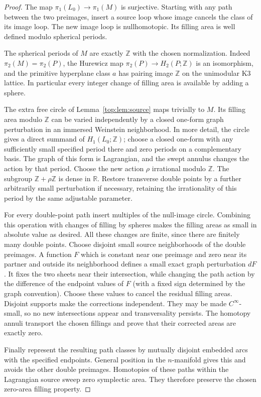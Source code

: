 \documentclass[11pt]{article}
\numberwithin{equation}{section}
\theoremstyle{definition}
\theoremstyle{remark}
\newcommand{\R}{\mathbb R}
\newcommand{\Z}{\mathbb Z}
\begin{document}
\begin{proof}
The map $\pi_1(L_0)\to\pi_1(M)$ is surjective.  Starting with any
path between the two preimages, insert a source loop whose image
cancels the class of its image loop.  The new image loop is
nullhomotopic.  Its filling area is well defined modulo spherical
periods.

The spherical periods of $M$ are exactly $\Z$ with the chosen
normalization.  Indeed $\pi_2(M)=\pi_2(P)$, the Hurewicz map
$\pi_2(P)\to H_2(P;\Z)$ is an isomorphism, and the primitive
hyperplane class $a$ has pairing image $\Z$ on the unimodular K3
lattice.  In particular every integer change of filling area is
available by adding a sphere.

The extra free circle of Lemma~\ref{top:lem:source} maps trivially to
$M$.  Its filling area modulo $\Z$ can be varied independently by a
closed one-form graph perturbation in an immersed Weinstein
neighborhood.  In more detail, the circle gives a direct summand of
$H_1(L_0;\Z)$; choose a closed one-form with any sufficiently small
specified period there and zero periods on a complementary basis.
The graph of this form is Lagrangian, and the swept annulus changes
the action by that period.  Choose the new action $\rho$ irrational
modulo $\Z$.  The subgroup $\Z+\rho\Z$ is dense in $\R$.
Restore transverse double points by a further arbitrarily small
perturbation if necessary, retaining the irrationality of this
period by the same adjustable parameter.

For every double-point path insert multiples of the null-image
circle.  Combining this operation with changes of filling by spheres
makes the filling areas as small in absolute value as desired.  All
these changes are finite, since there are finitely many double
points.  Choose disjoint small source neighborhoods of the double
preimages.  A function $F$ which is constant near one preimage and
zero near its partner and outside its neighborhood defines a small
exact graph perturbation $dF$.  It fixes the two sheets near their
intersection, while changing the path action by the difference of
the endpoint values of $F$ (with a fixed sign determined by the
graph convention).  Choose these values to cancel the residual
filling areas.  Disjoint supports make the corrections independent.
They may be made $C^\infty$-small, so no new intersections appear and
transversality persists.  The homotopy annuli transport the chosen
fillings and prove that their corrected areas are exactly zero.

Finally represent the resulting path classes by mutually disjoint
embedded arcs with the specified endpoints.  General position in
the $n$-manifold gives this and avoids the other double preimages.
Homotopies of these paths within the Lagrangian source sweep zero
symplectic area.  They therefore preserve the chosen zero-area
filling property.
\end{proof}
\end{document}
